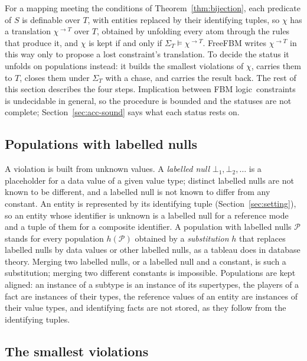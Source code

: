 \documentclass[11pt]{amsart}
\theoremstyle{definition}
\theoremstyle{remark}
\newcommand{\FBM}{FBM logic}
\newcommand{\pop}{\mathcal{P}}
\begin{document}
For a mapping meeting the conditions of Theorem~\ref{thm:bijection},
each predicate of $S$ is definable over $T$, with entities replaced by their
identifying tuples, so $\chi$ has a translation $\chi^{\to T}$ over $T$,
obtained by unfolding every atom through the rules that produce it, and
$\chi$ is kept if and only if $\Sigma_T \models \chi^{\to T}$. FreeFBM
writes $\chi^{\to T}$ in this way only to propose a lost constraint's
translation. To decide the status it unfolds on populations instead: it
builds the smallest violations of $\chi$, carries them to $T$, closes them
under $\Sigma_T$ with a chase, and carries the result back. The rest of
this section describes the four steps. Implication between \FBM\
constraints is undecidable in general, so the procedure is bounded and the
statuses are not complete; Section~\ref{sec:acc-sound} says what each
status rests on.

\subsection{Populations with labelled nulls}

A violation is built from unknown values. A \emph{labelled null}
$\bot_1, \bot_2, \ldots$ is a placeholder for a data value of a given value
type; distinct labelled nulls are not known to be different, and a
labelled null is not known to differ from any constant. An entity is
represented by its identifying tuple (Section~\ref{sec:setting}), so an
entity whose identifier is unknown is a labelled null for a reference mode
and a tuple of them for a composite identifier. A population with labelled
nulls $\pop$ stands for every population $h(\pop)$ obtained by a
\emph{substitution} $h$ that replaces labelled nulls by data values or
other labelled nulls, as a tableau does in database theory. Merging two
labelled nulls, or a labelled null and a constant, is such a substitution;
merging two different constants is impossible. Populations are kept
aligned: an instance of a subtype is an instance of its supertypes, the
players of a fact are instances of their types, the reference values of an
entity are instances of their value types, and identifying facts are not
stored, as they follow from the identifying tuples.

\subsection{The smallest violations}
\end{document}
